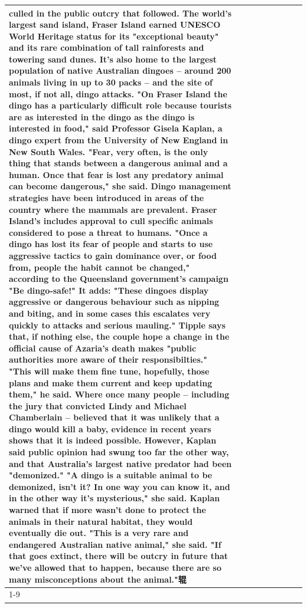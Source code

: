 \begin{table}[H]
\begin{tabular}{lllrlllll}
culled in the public outcry that followed. The world's largest sand island, Fraser Island earned UNESCO World Heritage status for its "exceptional beauty" and its rare combination of tall rainforests and towering sand dunes. It's also home to the largest population of native Australian dingoes -- around 200 animals living in up to 30 packs -- and the site of most, if not all, dingo attacks. "On Fraser Island the dingo has a particularly difficult role because tourists are as interested in the dingo as the dingo is interested in food," said Professor Gisela Kaplan, a dingo expert from the University of New England in New South Wales. "Fear, very often, is the only thing that stands between a dangerous animal and a human. Once that fear is lost any predatory animal can become dangerous," she said. Dingo management strategies have been introduced in areas of the country where the mammals are prevalent. Fraser Island's includes approval to cull specific animals considered to pose a threat to humans. "Once a dingo has lost its fear of people and starts to use aggressive tactics to gain dominance over, or food from, people the habit cannot be changed," according to the Queensland government's campaign "Be dingo-safe!" It adds: "These dingoes display aggressive or dangerous behaviour such as nipping and biting, and in some cases this escalates very quickly to attacks and serious mauling." Tipple says that, if nothing else, the couple hope a change in the official cause of Azaria's death makes "public authorities more aware of their responsibilties." "This will make them fine tune, hopefully, those plans and make them current and keep updating them," he said. Where once many people -- including the jury that convicted Lindy and Michael Chamberlain -- believed that it was unlikely that a dingo would kill a baby, evidence in recent years shows that it is indeed possible. However, Kaplan said public opinion had swung too far the other way, and that Australia's largest native predator had been "demonized." "A dingo is a suitable animal to be demonized, isn't it? In one way you can know it, and in the other way it's mysterious," she said. Kaplan warned that if more wasn't done to protect the animals in their natural habitat, they would eventually die out. "This is a very rare and endangered Australian native animal," she said. "If that goes extinct, there will be outcry in future that we've allowed that to happen, because there are so many misconceptions about the animal."辊 \\
\cline{1-9}

\end{tabular}
\end{table}
